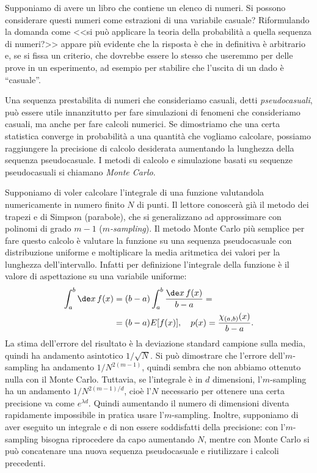 

Supponiamo di avere un libro che contiene un elenco di numeri.
Si possono considerare questi numeri come estrazioni di una variabile casuale?
Riformulando la domanda come
<<si può applicare la teoria della probabilità a quella sequenza di numeri?>>
appare più evidente che la risposta è che in definitiva è arbitrario e,
se si fissa un criterio,
che dovrebbe essere lo stesso che useremmo per delle prove in un esperimento,
ad esempio per stabilire che l'uscita di un dado è ``casuale''.

Una sequenza prestabilita di numeri che consideriamo casuali,
detti \emph{pseudocasuali},
può essere utile innanzitutto per fare simulazioni di fenomeni che consideriamo casuali,
ma anche per fare calcoli numerici.
Se dimostriamo che una certa statistica converge in probabilità a una quantità che vogliamo calcolare,
possiamo raggiungere la precisione di calcolo desiderata aumentando la lunghezza della sequenza pseudocasuale.
I metodi di calcolo e simulazione basati su sequenze pseudocasuali si chiamano \emph{Monte Carlo}.


Supponiamo di voler calcolare l'integrale di una funzione valutandola numericamente in numero finito $N$ di punti.
Il lettore conoscerà già il metodo dei trapezi e di Simpson (parabole),
che si generalizzano ad approssimare con polinomi di grado $m-1$ (\emph{$m$-sampling}).
Il metodo Monte Carlo più semplice per fare questo calcolo
è valutare la funzione su una sequenza pseudocasuale con distribuzione uniforme
e moltiplicare la media aritmetica dei valori per la lunghezza dell'intervallo.
Infatti per definizione l'integrale della funzione è il valore di aspettazione su una variabile uniforme:
\begin{align*}
	\int_a^b \de x\,f(x)
	&= (b-a)\int_a^b \frac{\de x\,f(x)}{b-a} = \\
	&= (b-a) E[f(x)], \quad p(x) = \frac{\chi_{(a,b)}(x)}{b-a}.
\end{align*}
La stima dell'errore del risultato è la deviazione standard campione sulla media,
quindi ha andamento asintotico $1/\sqrt N$.
Si può dimostrare che l'errore dell'$m$-sampling ha andamento $1/N^{2(m-1)}$,
quindi sembra che non abbiamo ottenuto nulla con il Monte Carlo.
Tuttavia, se l'integrale è in $d$ dimensioni, l'$m$-sampling ha un andamento $1/N^{2(m-1)/d}$,
cioè l'$N$ necessario per ottenere una certa precisione va come $e^{\lambda d}$.
Quindi aumentando il numero di dimensioni diventa rapidamente impossibile in pratica usare l'$m$-sampling.
Inoltre, supponiamo di aver eseguito un integrale e di non essere soddisfatti della precisione:
con l'$m$-sampling bisogna riprocedere da capo aumentando $N$,
mentre con Monte Carlo si può concatenare una nuova sequenza pseudocasuale e riutilizzare i calcoli precedenti.

